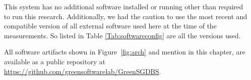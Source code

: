 



%

%

This system has no additional software installed or running other than required to run this research. Additionally, we had the caution to use the most recent and compatible version of all external software used here at the time of the measurements. So listed in Table \ref{Tab:softwareconfig} are all the versions used.







All software artifacts shown in Figure~\ref{fig:arch} and mention in this chapter, are  available as a public repository at \url{https://github.com/greensoftwarelab/GreenSGDBS}.
